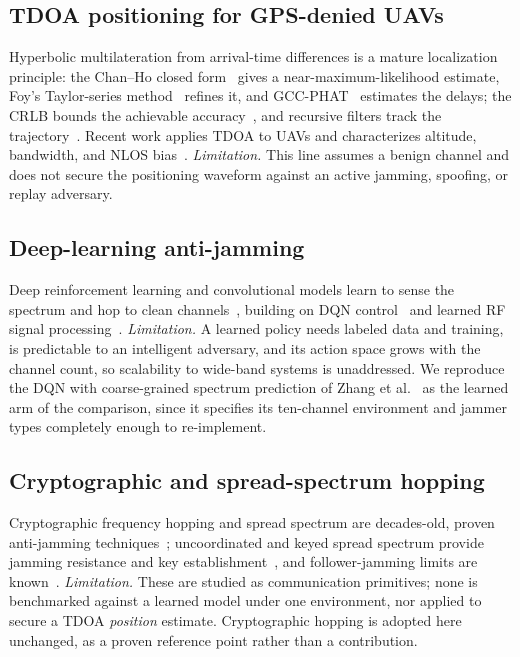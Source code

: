 \documentclass[journal]{IEEEtran}
\begin{document}
\subsection{TDOA positioning for GPS-denied UAVs}
Hyperbolic multilateration from arrival-time differences is a mature
localization principle: the Chan--Ho closed form~\cite{ref6} gives a
near-maximum-likelihood estimate, Foy's Taylor-series method~\cite{ref8}
refines it, and GCC-PHAT~\cite{ref7} estimates the delays; the CRLB bounds the
achievable accuracy~\cite{ref27,ref29,ref30}, and recursive filters track the
trajectory~\cite{ref26}. Recent work applies TDOA to UAVs and characterizes
altitude, bandwidth, and NLOS bias~\cite{ref9,ref10,ref15}.
\emph{Limitation.} This line assumes a benign channel and does not secure the
positioning waveform against an active jamming, spoofing, or replay adversary.

\subsection{Deep-learning anti-jamming}
Deep reinforcement learning and convolutional models learn to sense the spectrum
and hop to clean channels~\cite{ref11,ref12,ref13,ref31}, building on DQN
control~\cite{ref35} and learned RF signal processing~\cite{ref33,ref34}.
\emph{Limitation.} A learned policy needs labeled data and training, is
predictable to an intelligent adversary, and its action space grows with the
channel count, so scalability to wide-band systems is unaddressed. We reproduce
the DQN with coarse-grained spectrum prediction of Zhang et al.~\cite{ref11}
as the learned arm of the comparison, since it specifies its ten-channel
environment and jammer types completely enough to re-implement.

\subsection{Cryptographic and spread-spectrum hopping}
Cryptographic frequency hopping and spread spectrum are decades-old, proven
anti-jamming techniques~\cite{ref1,ref4,ref5,ref32}; uncoordinated and keyed
spread spectrum provide jamming resistance and key
establishment~\cite{ref2,ref16}, and follower-jamming limits are
known~\cite{ref3}. \emph{Limitation.} These are studied as communication
primitives; none is benchmarked against a learned model under one environment,
nor applied to secure a TDOA \emph{position} estimate. Cryptographic hopping is
adopted here unchanged, as a proven reference point rather than a contribution.
\end{document}

